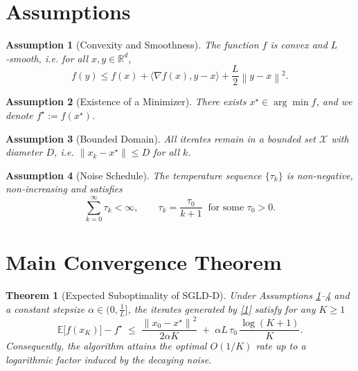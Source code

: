 \documentclass{article}
\newtheorem{theorem}{Theorem}
\newtheorem{assumption}{Assumption}
\newcommand{\EE}{\mathbb{E}}
\newcommand{\RR}{\mathbb{R}}
\newcommand{\norm}[1]{\left\|#1\right\|}
\newcommand{\inner}[2]{\langle #1,#2\rangle}
\begin{document}
\section*{Assumptions}
\begin{assumption}[Convexity and Smoothness]\label{ass:convex}
The function $f$ is convex and $L$‑smooth, i.e. for all $x,y\in\RR^d$,
\[
f(y)\le f(x)+\inner{\nabla f(x)}{y-x}+\frac{L}{2}\norm{y-x}^2 .
\tag{3}
\]
\end{assumption}
\begin{assumption}[Existence of a Minimizer]\label{ass:opt}
There exists $x^\star\in\arg\min f$, and we denote $f^\star:=f(x^\star)$.
\end{assumption}
\begin{assumption}[Bounded Domain]\label{ass:bound}
All iterates remain in a bounded set $\mathcal X$ with diameter $D$, i.e. $\norm{x_k-x^\star}\le D$ for all $k$.
\end{assumption}
\begin{assumption}[Noise Schedule]\label{ass:noise}
The temperature sequence $\{\tau_k\}$ is non‑negative, non‑increasing and satisfies  
\[
\sum_{k=0}^{\infty}\tau_k <\infty ,\qquad 
\tau_k = \frac{\tau_0}{k+1}\;\; \text{for some }\tau_0>0 .
\tag{4}
\]
\end{assumption}

\section*{Main Convergence Theorem}
\begin{theorem}[Expected Suboptimality of SGLD‑D]\label{thm:main}
Under Assumptions \ref{ass:convex}–\ref{ass:noise} and a constant stepsize $\alpha\in\bigl(0,\tfrac{1}{L}\bigr]$, the iterates generated by \eqref{1} satisfy for any $K\ge 1$
\[
\EE\!\bigl[f(x_K)\bigr]-f^\star
\;\le\;
\frac{\norm{x_0-x^\star}^2}{2\alpha K}
\;+\;
\alpha L\,\tau_0\,\frac{\log (K+1)}{K}.
\tag{5}
\]
Consequently, the algorithm attains the optimal $O(1/K)$ rate up to a logarithmic factor induced by the decaying noise.
\end{theorem}
\end{document}
